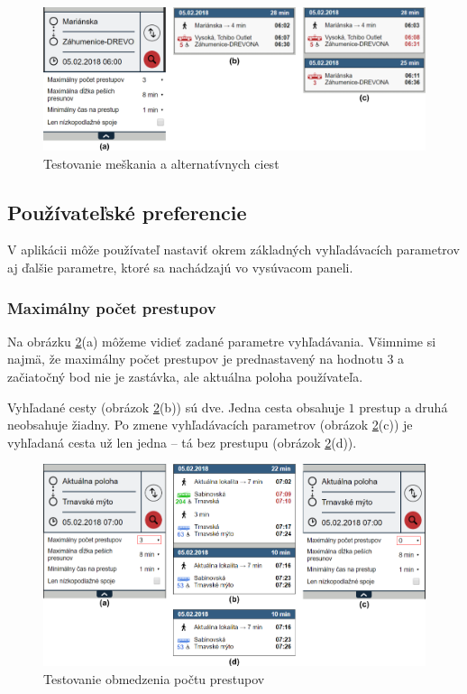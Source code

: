 \begin{figure}[H]
\centerline{\includegraphics[width=1.0\textwidth]{images/test/delay-alternative}}
\caption[Testovanie meškania a alternatívnych ciest]{Testovanie meškania a alternatívnych ciest}
\label{fig:test-delay-alternative}
\end{figure}

\subsection{Používateľské preferencie}

V aplikácii môže používateľ nastaviť okrem základných vyhľadávacích parametrov aj ďalšie parametre, ktoré sa nachádzajú vo vysúvacom paneli. 

\subsubsection{Maximálny počet prestupov}
Na obrázku \ref{fig:test-max-transfers}(a) môžeme vidieť zadané parametre vyhľadávania. Všimnime si najmä, že maximálny počet prestupov je prednastavený na hodnotu $3$ a začiatočný bod nie je zastávka, ale aktuálna poloha používateľa. 

Vyhľadané cesty (obrázok \ref{fig:test-max-transfers}(b)) sú dve. Jedna cesta obsahuje $1$ prestup a druhá neobsahuje žiadny. Po zmene vyhľadávacích parametrov (obrázok \ref{fig:test-max-transfers}(c)) je vyhľadaná cesta už len jedna – tá bez prestupu (obrázok \ref{fig:test-max-transfers}(d)).

\begin{figure}[H]
\centerline{\includegraphics[width=1.0\textwidth]{images/test/max-transfers-act}}
\caption[Testovanie obmedzenia počtu prestupov]{Testovanie obmedzenia počtu prestupov}
\label{fig:test-max-transfers}
\end{figure}

